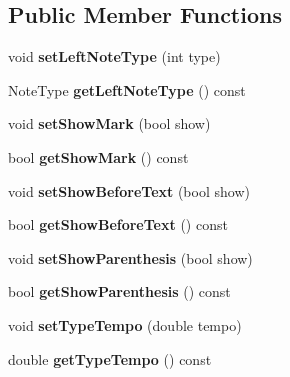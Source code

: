 \subsection*{Public Member Functions}
\begin{DoxyCompactItemize}
\item 
\mbox{\label{class_o_v_e_1_1_tempo_a8263ad7129371ecf4eafdcf060945efd}} 
void {\bfseries set\+Left\+Note\+Type} (int type)
\item 
\mbox{\label{class_o_v_e_1_1_tempo_a26d0ec9a4249c796b08b113f42e1539a}} 
Note\+Type {\bfseries get\+Left\+Note\+Type} () const
\item 
\mbox{\label{class_o_v_e_1_1_tempo_a2ac23c99c51dc629fc5718990f02e205}} 
void {\bfseries set\+Show\+Mark} (bool show)
\item 
\mbox{\label{class_o_v_e_1_1_tempo_af85fcbfcd29ffed9a5142ba6f28bb188}} 
bool {\bfseries get\+Show\+Mark} () const
\item 
\mbox{\label{class_o_v_e_1_1_tempo_a0d84c9d0fd8c210a1dd4b148b9a41d1a}} 
void {\bfseries set\+Show\+Before\+Text} (bool show)
\item 
\mbox{\label{class_o_v_e_1_1_tempo_ac81a2bac289d843f4547e3d753241688}} 
bool {\bfseries get\+Show\+Before\+Text} () const
\item 
\mbox{\label{class_o_v_e_1_1_tempo_aaae48f2d4d1d7c85582a280744c1129d}} 
void {\bfseries set\+Show\+Parenthesis} (bool show)
\item 
\mbox{\label{class_o_v_e_1_1_tempo_a6f3530a547111976dd14b9df021e131c}} 
bool {\bfseries get\+Show\+Parenthesis} () const
\item 
\mbox{\label{class_o_v_e_1_1_tempo_aed2a065cc43f191717a46a9df0b7e151}} 
void {\bfseries set\+Type\+Tempo} (double tempo)
\item 
\mbox{\label{class_o_v_e_1_1_tempo_a87f717c3733cb821e421c0d8502ae6a2}} 
double {\bfseries get\+Type\+Tempo} () const

\end{DoxyCompactItemize}
